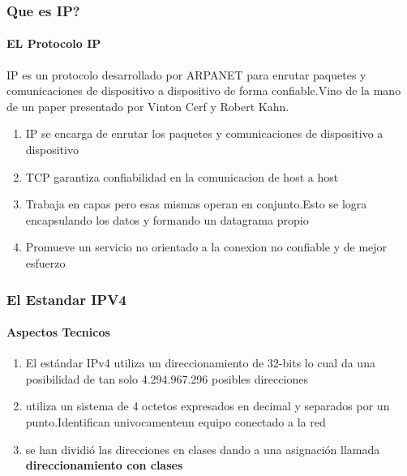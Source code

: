\documentclass{beamer}
\begin{document}
\begin{frame}
\frametitle{Que es IP? }
\framesubtitle{EL Protocolo IP}


	IP es un protocolo desarrollado por ARPANET para enrutar paquetes y comunicaciones de dispositivo a dispositivo de forma confiable.Vino de la mano de un paper presentado por Vinton Cerf y Robert Kahn.
\begin{enumerate}[$*$]

	\item IP se encarga de enrutar los paquetes y comunicaciones de dispositivo a dispositivo
	\item TCP garantiza confiabilidad  en la comunicacion de host a host
	\item Trabaja en capas pero esas mismas operan en conjunto.Esto se logra encapsulando los datos y formando un 			datagrama propio
	\item Promueve un servicio no orientado a la conexion no confiable y de mejor esfuerzo
	
\end{enumerate}
\end{frame}



\begin{frame}
\frametitle{El Estandar IPV4}
\framesubtitle{Aspectos Tecnicos}


\begin{enumerate}[$*$]

	\item El estándar IPv4 utiliza un direccionamiento de 32-bits  lo cual da una posibilidad de tan solo 
		4.294.967.296 posibles direcciones
	\item utiliza un sistema de 4 octetos expresados en decimal y separados por un punto.Identifican univocamenteun equipo conectado a la red
	\item se han dividió las direcciones en clases
dando a una asignación llamada \textbf{direccionamiento con clases}
	
\end{enumerate}
\end{frame}

%



	
	
\end{document}
